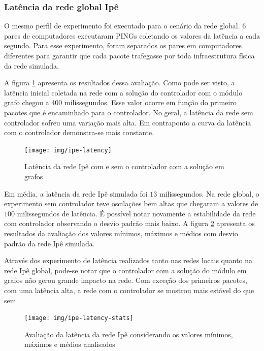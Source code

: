 \subsubsection{Latência da rede global Ipê}

O mesmo perfil de experimento foi executado para o cenário da rede global.
6 pares de computadores executaram PINGs coletando os valores da latência
a cada segundo.
Para esse experimento, foram separados os pares em computadores diferentes
para garantir que cada pacote trafegasse por toda infraestrutura física da
rede simulada.

A figura \ref{fig:ipe-latency} apresenta os resultados dessa avaliação.
Como pode ser visto, a latência inicial coletada na rede com a solução do
controlador com o módulo grafo chegou a 400 milissegundos.
Esse valor ocorre em função do primeiro pacotes que é encaminhado para o
controlador.
No geral, a latência da rede sem controlador sofreu uma variação mais alta.
Em contraponto a curva da latência com o controlador demonstra-se mais
constante.

\begin{figure}[!htb]
    \centering
    \label{fig:ipe-latency}
    \texttt{[image: img/ipe-latency]}
    \caption{Latência da rede Ipê com e sem o controlador com a solução em
    grafos}
\end{figure}

Em média, a latência da rede Ipê simulada foi $13$ milissegundos.
Na rede global, o experimento sem controlador teve oscilações bem altas que
chegaram a valores de $100$ milissegundos de latência.
É possível notar novamente a estabilidade da rede com controlador observando
o desvio padrão mais baixo.
A figura \ref{fig:ipe-latency-stats} apresenta os resultados da avaliação dos
valores mínimos, máximos e médios com desvio padrão da rede Ipê simulada.

Através dos experimento de latência realizados tanto nas redes locais quanto
na rede Ipê global, pode-se notar que o controlador com a solução do módulo
em grafos não gerou grande impacto na rede.
Com exceção dos primeiros pacotes, com uma latência alta, a rede com o
controlador se mostrou mais estável do que sem.

\begin{figure}[!htb]
    \centering
    \label{fig:ipe-latency-stats}
    \texttt{[image: img/ipe-latency-stats]}
    \caption{Avaliação da latência da rede Ipê considerando os valores mínimos,
    máximos e médios analisados}
\end{figure}

